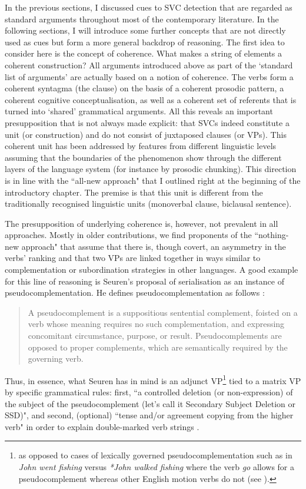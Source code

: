 In the previous sections, I discussed cues to SVC detection that are regarded as standard arguments throughout most of the contemporary literature. In the following sections, I will introduce some further concepts that are not directly used as cues but form a more general backdrop of reasoning. The first idea to consider here is the concept of coherence. What makes a string of elements a coherent construction? All arguments introduced above as part of the `standard list of arguments' are actually based on a notion of coherence. The verbs form a coherent syntagma (the clause) on the basis of a coherent prosodic pattern, a coherent cognitive conceptualisation, as well as a coherent set of referents that is turned into `shared' grammatical arguments. All this reveals an important presupposition that is not always made explicit: that SVCs indeed constitute a unit (or construction) and do not consist of juxtaposed clauses (or VPs). This coherent unit has been addressed by features from different linguistic levels assuming that the boundaries of the phenomenon show through the different layers of the language system (for instance by prosodic chunking). This direction is in line with the ``all-new approach" that I outlined right at the beginning of the introductory chapter. The premise is that this unit is different from the traditionally recognised linguistic units (monoverbal clause, biclausal sentence). 

The presupposition of underlying coherence is, however, not prevalent in all approaches. Mostly in older contributions, we find proponents of the ``nothing-new approach" that assume that there is, though covert, an asymmetry in the verbs' ranking and that two VPs are linked together in ways similar to complementation or subordination strategies in other languages. A good example for this line of reasoning is Seuren's proposal of serialisation as an instance of pseudocomplementation. He defines pseudocomplementation as follows \citep[196]{seuren1991definition}: 

\begin{quote} A pseudocomplement is a suppositious sentential complement, foisted on a verb whose meaning requires no such complementation, and expressing concomitant circumstance, purpose, or result. Pseudocomplements are opposed to proper complements, which are semantically required by the governing verb.
\end{quote}

Thus, in essence, what Seuren has in mind is an adjunct VP\footnote{as opposed to cases of lexically governed pseudocomplementation such as in \textit{John went fishing} versus \textit{*John walked fishing} where the verb \textit{go} allows for a pseudocomplement whereas other English motion verbs do not (see \citealt[197]{seuren1991definition}).} tied to a matrix VP by specific grammatical rules: first, ``a controlled deletion (or non-expression) of the subject of the pseudocomplement (let's call it Secondary Subject Deletion or SSD)", and second, (optional) ``tense and/or agreement copying from the higher verb" in order to explain double-marked verb strings \citep[197]{seuren1991definition}.

